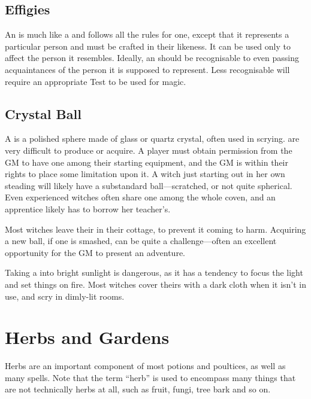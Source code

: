\subsection{Effigies}

An  is much like a  and follows all the rules for one, except that it represents a particular person and must be crafted in their likeness.
It can be used only to affect the person it resembles.
Ideally, an  should be recognisable to even passing acquaintances of the person it is supposed to represent.
Less recognisable  will require an appropriate Test to be used for magic.

\subsection{Crystal Ball}

A  is a polished sphere made of glass or quartz crystal, often used in scrying.
 are very difficult to produce or acquire.
A player must obtain permission from the GM to have one among their starting equipment, and the GM is within their rights to place some limitation upon it.
A witch just starting out in her own steading will likely have a substandard ball---scratched, or not quite spherical.
Even experienced witches often share one among the whole coven, and an apprentice likely has to borrow her teacher's.

Most witches leave their  in their cottage, to prevent it coming to harm.
Acquiring a new ball, if one is smashed, can be quite a challenge---often an excellent opportunity for the GM to present an adventure.

Taking a  into bright sunlight is dangerous, as it has a tendency to focus the light and set things on fire.
Most witches cover theirs with a dark cloth when it isn't in use, and scry in dimly-lit rooms.


\section{Herbs and Gardens}

Herbs are an important component of most potions and poultices, as well as many spells.
Note that the term ``herb'' is used to encompass many things that are not technically herbs at all, such as fruit, fungi, tree bark and so on.

